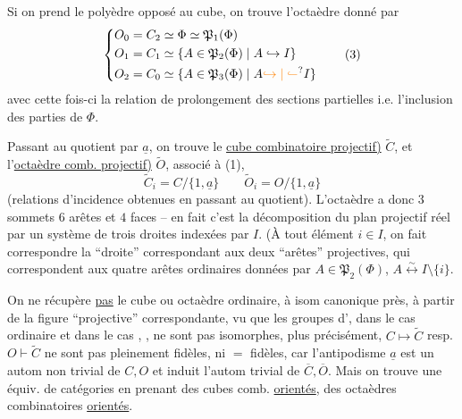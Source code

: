 Si on prend le polyèdre opposé au cube, on trouve l'octaèdre donné par
\[
\left\{\begin{aligned}
 O_0&=C_2\simeq\Phi\simeq\mathfrak P_1(\Phi)\\
 O_1&=C_1\simeq\{A\in\mathfrak P_2(\Phi)\mid A\hookrightarrow I\}\\
 O_2&=C_0\simeq\{A\in\mathfrak P_3(\Phi)\mid A\unsure{\hookrightarrow|\lhook\joinrel\relbar} I\}
\end{aligned}\right.\tag*{(3)}
\]
avec cette fois-ci la relation  de prolongement des sections
partielles i.e. l'inclusion des parties de $\Phi$.

Passant au quotient par $\underline a$, on trouve le \uline{cube combinatoire  projectif)} $\widetilde C$, et l'\uline{octaèdre comb.  projectif)} $\widetilde O$, associé à (1),
\[
\widetilde C_i=C/\{1,\underline a\}\qquad
\widetilde O_i=O/\{1,\underline a\}\tag*{(4)}
\]
(relations d'incidence obtenues en passant au quotient). L'octaèdre   a donc $3$ sommets $6$ arêtes et $4$ faces -- en fait c'est la décomposition du plan projectif réel par un système de trois droites indexées par $I$. (À tout élément $i\in I$, on fait correspondre la ``droite'' correspondant aux deux ``arêtes'' projectives, qui correspondent aux quatre arêtes ordinaires données par $A\in\mathfrak P_2(\Phi)$,
$A\overset{\sim}{\longleftrightarrow}I\setminus\{i\}$.

On ne récupère \uline{pas} le cube ou octaèdre ordinaire, à isom canonique près, à partir de la figure  ``projective'' correspondante, vu que les groupes d', dans le cas ordinaire et dans le cas , , ne sont pas isomorphes, plus précisément, $C\mapsto\widetilde C$ resp. $O\vdash\widetilde{C}$
ne sont pas pleinement fidèles, ni $=$ fidèles, car l'antipodisme $\underline a$ est un autom non trivial de $C,O$ et induit l'autom trivial de $\overline C,\overline O$. Mais on trouve une équiv. de catégories en prenant des cubes comb. \uline{orientés}, des octaèdres combinatoires \uline{orientés}.

